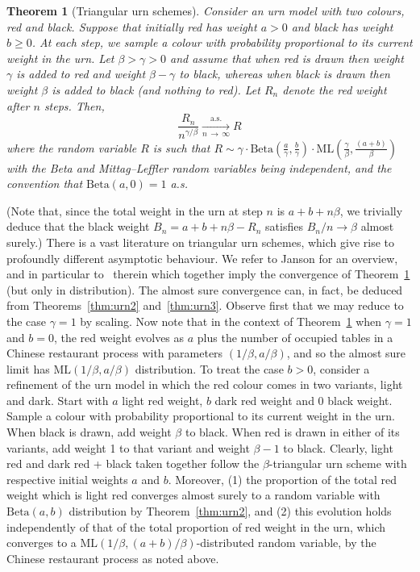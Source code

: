 \documentclass[10pt]{amsart}
\newtheorem{theo}{Theorem}[section]
\theoremstyle{definition}\newtheorem{defi}[theo]{Definition}\newtheorem{rema}[theo]{Remark}\newtheorem{exam}[theo]{Example}\newtheorem{exem}[theo]{Example}\newtheorem{nota}[theo]{Notation}
\newcommand{\Betal}{\mathrm{Beta}}
\newcommand{\ML}{\mathrm{ML}}
\begin{document}
\begin{theo}[Triangular urn schemes]\label{thm:urn1}
Consider an urn model with two colours, red and black. Suppose that initially red has weight $a>0$ and black has weight $b \geq 0$. At each step, we sample a colour with probability proportional to its current weight in the urn. Let $\beta>\gamma > 0$ and assume that when red is drawn then weight $\gamma$ is added to red and weight $\beta-\gamma$ to black, whereas when black is drawn then weight $\beta$ is added to black (and nothing to red). Let $R_n$ denote the red weight after $n$ steps. Then,
\[
\frac{R_n}{n^{\gamma/\beta}} \underset{n\,\rightarrow\,\infty}{\overset{\text{a.s.}}\longrightarrow} R
\]
where the random variable $R$ is such that $R\sim \gamma \cdot \Betal(\frac{a}{\gamma},\frac{b}{\gamma})\cdot \ML\left(\frac{\gamma}{\beta},\frac{(a+b)}{\beta}\right)$ with the Beta and Mittag--Leffler random variables being independent, and the convention that $\Betal(a,0) = 1$ a.s.
\end{theo}

(Note that, since the total weight in the urn at step $n$ is $a + b + n\beta$, we trivially deduce that the black weight $B_n = a + b + n\beta -R_n$ satisfies $B_n/n \to \beta$ almost surely.) There is a vast literature on triangular urn schemes, which give rise to profoundly different asymptotic behaviour. We refer to Janson for an overview, and in particular to~\cite[Theorems~1.3 and 1.7]{Janson} therein which together imply the convergence of Theorem~\ref{thm:urn1} (but only in distribution). The almost sure convergence can, in fact, be deduced from Theorems~\ref{thm:urn2} and~\ref{thm:urn3}. Observe first that we may reduce to the case $\gamma = 1$ by scaling. Now note that in the context of Theorem~\ref{thm:urn1} when $\gamma=1$ and $b=0$, the red weight evolves as $a$ plus the number of occupied tables in a Chinese restaurant process with parameters $(1/\beta,a/\beta)$, and so the almost sure limit has $\ML(1/\beta,a/\beta)$ distribution. To treat the case $b > 0$, consider a refinement of the urn model in which the red colour comes in two variants, light and dark. Start with $a$ light red weight, $b$ dark red weight and 0 black weight. Sample a colour with probability proportional to its current weight in the urn. When black is drawn, add weight $\beta$ to black. When red is drawn in either of its variants, add weight 1 to that variant and weight $\beta-1$ to black. Clearly, light red and dark red + black taken together follow the $\beta$-triangular urn scheme with respective initial weights $a$ and $b$. Moreover, (1) the proportion of the total red weight which is light red converges almost surely to a random variable with $\Betal(a,b)$ distribution by Theorem~\ref{thm:urn2}, and (2) this evolution holds independently of that of the total proportion of red weight in the urn, which converges to a $\ML(1/\beta,(a+b)/\beta)$-distributed random variable, by the Chinese restaurant process as noted above.
\end{document}
